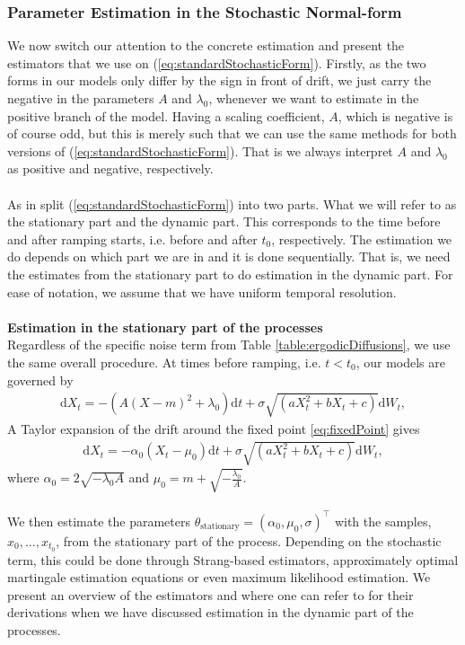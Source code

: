 \subsubsection{Parameter Estimation in the Stochastic Normal-form}
We now switch our attention to the concrete estimation and present the estimators that we use on (\ref{eq:standardStochasticForm}). Firstly, as the two forms in our models only differ by the sign in front of drift, we just carry the negative in the parameters $A$ and $\lambda_0$, whenever we want to estimate in the positive branch of the model. Having a scaling coefficient, $A$, which is negative is of course odd, but this is merely such that we can use the same methods for both versions of (\ref{eq:standardStochasticForm}). That is we always interpret $A$ and $\lambda_0$ as positive and negative, respectively.\\\\
As in \cite{Ditlevsen2023} split (\ref{eq:standardStochasticForm}) into two parts. What we will refer to as the stationary part and the dynamic part. This corresponds to the time before and after ramping starts, i.e. before and after $t_0$, respectively. The estimation we do depends on which part we are in and it is done sequentially. That is, we need the estimates from the stationary part to do estimation in the dynamic part. For ease of notation, we assume that we have uniform temporal resolution. \\\\
\textbf{Estimation in the stationary part of the processes}\\
Regardless of the specific noise term from Table \ref{table:ergodicDiffusions}, we use the same overall procedure. At times before ramping, i.e. $t < t_0$, our models are governed by
\begin{align}
    \mathrm{d}X_t = -\left(A(X - m)^2 + \lambda_0\right)\mathrm{d}t + \sigma\sqrt{\left(aX_t^2 + bX_t + c\right)}\mathrm{d}W_t, 
\end{align}
A Taylor expansion of the drift around the fixed point \ref{eq:fixedPoint} gives
\begin{align}
    \mathrm{d}X_t = -\alpha_0\left(X_t - \mu_0\right)\mathrm{d}t + \sigma\sqrt{\left(aX_t^2 + bX_t + c\right)}\mathrm{d}W_t, \label{eq:TaylorStationary}
\end{align}
where $\alpha_0 = 2\sqrt{-\lambda_0 A}$ and $\mu_0 = m + \sqrt{-\frac{\lambda_0}{A}}$.\\\\
We then estimate the parameters $\theta_{\mathrm{stationary}} = (\alpha_0, \mu_0, \sigma)^\top$ with the samples, $x_{0}, \dots, x_{t_0}$, from the stationary part of the process. Depending on the stochastic term, this could be done through Strang-based estimators, approximately optimal martingale estimation equations or even maximum likelihood estimation. We present an overview of the estimators and where one can refer to for their derivations when we have discussed estimation in the dynamic part of the processes.\\\\
